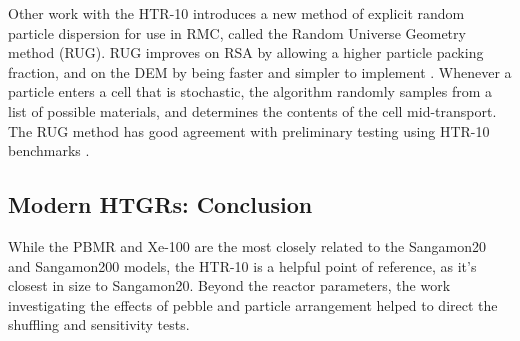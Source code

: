 Other work with the HTR-10 introduces a new method of explicit random particle dispersion for use in RMC, called the Random Universe Geometry method (RUG).  RUG improves on RSA by allowing a higher particle packing fraction, and on the DEM by being faster and simpler to implement \cite{liu_random_2018}.  Whenever a particle enters a cell that is stochastic, the algorithm randomly samples from a list of possible materials, and determines the contents of the cell mid-transport.  The RUG method has good agreement with preliminary testing using HTR-10 benchmarks \cite{liu_random_2018}.

\subsection{Modern HTGRs: Conclusion}

While the PBMR and Xe-100 are the most closely related to the Sangamon20 and Sangamon200 models, the HTR-10 is a helpful point of reference, as it's closest in size to Sangamon20.  Beyond the reactor parameters, the work investigating the effects of pebble and particle arrangement helped to direct the shuffling and sensitivity tests.